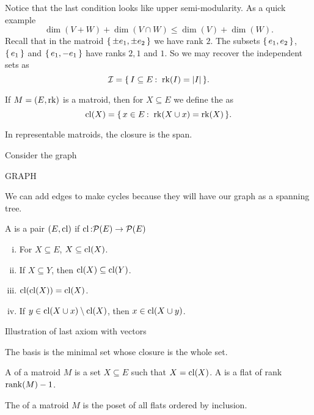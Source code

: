 \documentclass[12pt]{memoir}
\begin{document}
Notice that the last condition looks like upper semi-modularity. As a quick example 
$$\dim(V+W)+\dim(V\cap W)\leq \dim(V)+\dim(W).$$
Recall that in the matroid $\{\,\pm e_1,\pm e_2\,\}$ we have rank $2$. The subsets $\{\,e_1,e_2\,\}$, $\{\,e_1\,\}$ and $\{\,e_1,-e_1\,\}$ have ranks $2,1$ and $1$. So we may recover the independent sets as 
$$\cI=\set{I\subseteq E\:\ \rk(I)=|I|}.$$
\begin{Def}
    If $M=(E,\operatorname{rk})$ is a matroid, then for $X\subseteq E$ we define the  as 
    $$\cl(X)=\set{x\in E\:\ \rk(X\cup x)=\rk(X)}.$$
\end{Def}
In representable matroids, the closure is the span. 

\begin{Ex}
    Consider the graph
    \begin{center}
        GRAPH
    \end{center}
    We can add edges to make cycles because they will have our graph as a spanning tree.
\end{Ex}

\begin{Def}
    A  is a pair $(E,\operatorname{cl})$ if $\operatorname{cl}\mathbin{:}\mathcal{P}(E)\to\mathcal{P}(E)$
    \begin{enumerate}[i)]
        \itemsep=-0.4em
        \item For $X\subseteq E$, $X\subseteq\operatorname{cl}(X)$.
        \item If $X\subseteq Y$, then $\operatorname{cl}(X)\subseteq\operatorname{cl}(Y)$.
        \item $\operatorname{cl}(\operatorname{cl}(X))=\operatorname{cl}(X)$.
        \item If $y\in\operatorname{cl}(X\cup x)\setminus\operatorname{cl}(X)$, then $x\in\operatorname{cl}(X\cup y)$.
    \end{enumerate}
\end{Def}

\begin{Ex}
    Illustration of last axiom with vectors
\end{Ex}

The basis is the minimal set whose closure is the whole set.

\begin{Def}
    A  of a matroid $M$ is a set $X\subseteq E$ such that $X=\operatorname{cl}(X)$. A  is a flat of rank $\rank(M)-1$.
\end{Def}

\begin{Def}
    The  of a matroid $M$ is the poset of all flats ordered by inclusion. 
\end{Def}
\end{document}
